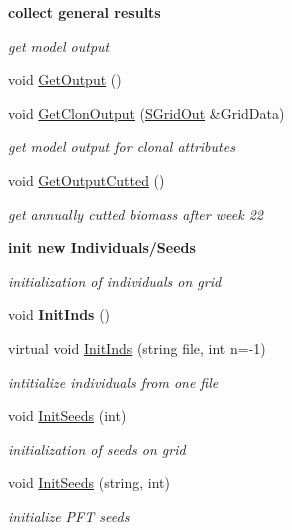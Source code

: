 \begin{Indent}\textbf{ collect general results}\par
{\em get model output }\begin{DoxyCompactItemize}
\item 
void \mbox{\hyperlink{class_c_grid_envir_ad14451529b1a3f9b7591f4d5b4e321c5}{Get\+Output}} ()
\item 
void \mbox{\hyperlink{class_c_grid_envir_a858b8e8281f1a80dc0b0a72b2b9a4346}{Get\+Clon\+Output}} (\mbox{\hyperlink{struct_s_grid_out}{S\+Grid\+Out}} \&Grid\+Data)
\begin{DoxyCompactList}\small\item\em get model output for clonal attributes \end{DoxyCompactList}\item 
void \mbox{\hyperlink{class_c_grid_envir_abc5ce523f3821da0a39e1eefa6068946}{Get\+Output\+Cutted}} ()
\begin{DoxyCompactList}\small\item\em get annually cutted biomass after week 22 \end{DoxyCompactList}\end{DoxyCompactItemize}
\end{Indent}
\begin{Indent}\textbf{ init new Individuals/\+Seeds}\par
{\em initialization of individuals on grid }\begin{DoxyCompactItemize}
\item 
\mbox{\label{class_c_grid_envir_adbc322fcf9a2e78a6be9a313a6c3dc05}} 
void {\bfseries Init\+Inds} ()
\item 
virtual void \mbox{\hyperlink{class_c_grid_envir_a0b5b1fcf08b608c6aed31fea9325c62b}{Init\+Inds}} (string file, int n=-\/1)
\begin{DoxyCompactList}\small\item\em intitialize individuals from one file \end{DoxyCompactList}\item 
\mbox{\label{class_c_grid_envir_a6e2ae4e3971d36cbabf8f1a602dd0f84}} 
void \mbox{\hyperlink{class_c_grid_envir_a6e2ae4e3971d36cbabf8f1a602dd0f84}{Init\+Seeds}} (int)
\begin{DoxyCompactList}\small\item\em initialization of seeds on grid \end{DoxyCompactList}\item 
void \mbox{\hyperlink{class_c_grid_envir_a7ade5ae05bab7f0fd7f6edef26001686}{Init\+Seeds}} (string, int)
\begin{DoxyCompactList}\small\item\em initialize P\+FT seeds \end{DoxyCompactList}\end{DoxyCompactItemize}
\end{Indent}
